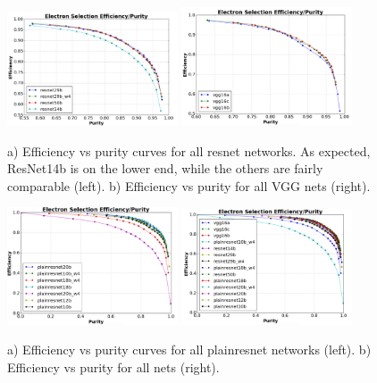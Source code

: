 \documentclass[11pt,a4paper]{article}
\begin{document}
\begin{figure}[t]
  \centering  
\includegraphics[width=0.45\textwidth]{Figures/resnet_effpur.png}
\hspace{2 mm}
\includegraphics[width=0.45\textwidth]{Figures/vgg_effpur.png}\\
\caption{a) Efficiency vs purity curves for all resnet networks.  As expected, ResNet14b is on the lower end, while the others are fairly comparable (left). b) Efficiency vs purity for all VGG nets (right). }
  \label{fig:resneteffpur}
\end{figure}

\begin{figure}[t]
  \centering  
\includegraphics[width=0.45\textwidth]{Figures/plainresnet_effpur.png}
\hspace{2 mm}
\includegraphics[width=0.45\textwidth]{Figures/all_effpur.png}\\
\caption{a) Efficiency vs purity curves for all plainresnet networks (left). b) Efficiency vs purity for all nets (right). }
  \label{fig:plainresneteffpur}
\end{figure}
\end{document}
